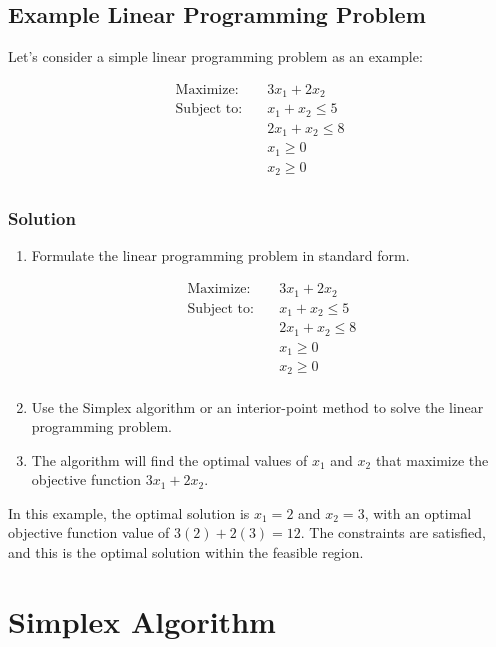 \documentclass[a4paper]{article}
\begin{document}
\subsection{Example Linear Programming Problem}

Let's consider a simple linear programming problem as an example:

\begin{align*}
\text{Maximize:} \quad & 3x_1 + 2x_2 \\
\text{Subject to:} \quad & x_1 + x_2 \leq 5 \\
& 2x_1 + x_2 \leq 8 \\
& x_1 \geq 0 \\
& x_2 \geq 0 \\
\end{align*}

\subsubsection{Solution}

\begin{enumerate}
    \item Formulate the linear programming problem in standard form.
    
    \begin{align*}
    \text{Maximize:} \quad & 3x_1 + 2x_2 \\
    \text{Subject to:} \quad & x_1 + x_2 \leq 5 \\
    & 2x_1 + x_2 \leq 8 \\
    & x_1 \geq 0 \\
    & x_2 \geq 0 \\
    \end{align*}
    
    \item Use the Simplex algorithm or an interior-point method to solve the linear programming problem.
    
    \item The algorithm will find the optimal values of \(x_1\) and \(x_2\) that maximize the objective function \(3x_1 + 2x_2\).
\end{enumerate}

In this example, the optimal solution is \(x_1 = 2\) and \(x_2 = 3\), with an optimal objective function value of \(3(2) + 2(3) = 12\). The constraints are satisfied, and this is the optimal solution within the feasible region.

\section{Simplex Algorithm}
\end{document}

